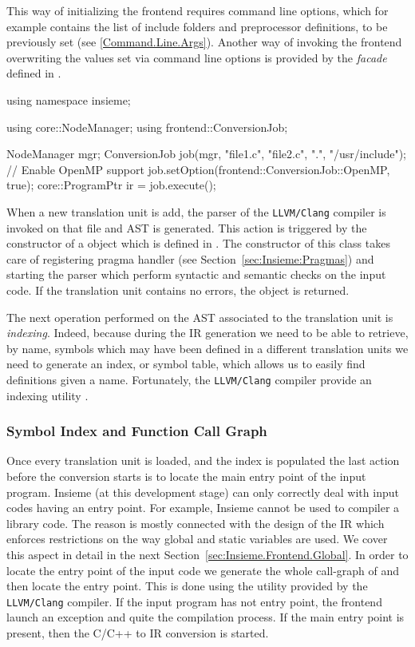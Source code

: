 This way of initializing the frontend requires command line options, which for
example contains the list of include folders and preprocessor definitions, to be
previously set (see \ref{Command.Line.Args}). Another way of invoking the
frontend overwriting the values set via command line options is
provided by the  \emph{facade} defined in
.

\begin{srcCode}
using namespace insieme;

using core::NodeManager;
using frontend::ConversionJob;

NodeManager mgr;
ConversionJob job(mgr, {"file1.c", "file2.c"}, {".", "/usr/include"});
// Enable OpenMP support
job.setOption(frontend::ConversionJob::OpenMP, true);
core::ProgramPtr ir = job.execute();
\end{srcCode}

When a new translation unit is add, the parser of the {\tt LLVM/Clang} compiler
is invoked on that file and AST is generated. This action is triggered by the
constructor of a  object which is defined in
. The constructor of this class takes care of
registering pragma handler (see Section~\ref{sec:Insieme:Pragmas}) and starting
the parser which perform syntactic and semantic checks on the input code. If the
translation unit contains no errors, the  object is
returned. 

The next operation performed on the AST associated to the translation unit is
\emph{indexing}. Indeed, because during the IR generation we need to be able to
retrieve, by name, symbols which may have been defined in a different
translation units we need to generate an index, or symbol table, which allows us
to easily find definitions given a name. Fortunately, the {\tt LLVM/Clang}
compiler provide an indexing utility .

\subsubsection{Symbol Index and Function Call Graph}
Once every translation unit is loaded, and the index is populated the last
action before the conversion starts is to locate the main entry point of the
input program. Insieme (at this development stage) can only correctly deal with
input codes having an entry point. For example, Insieme cannot be used to
compiler a library code. The reason is mostly connected with the design
of the IR which enforces restrictions on the way global and static variables are
used. We cover this aspect in detail in the next
Section~\ref{sec:Insieme.Frontend.Global}. In order to locate the entry point of
the input code we generate the whole call-graph of and then locate the entry
point. This is done using the  utility provided by the
{\tt LLVM/Clang} compiler. If the input program has not entry point, the
frontend launch an exception and quite the compilation process. If the main
entry point is present, then the C/C++ to IR conversion is started. 

